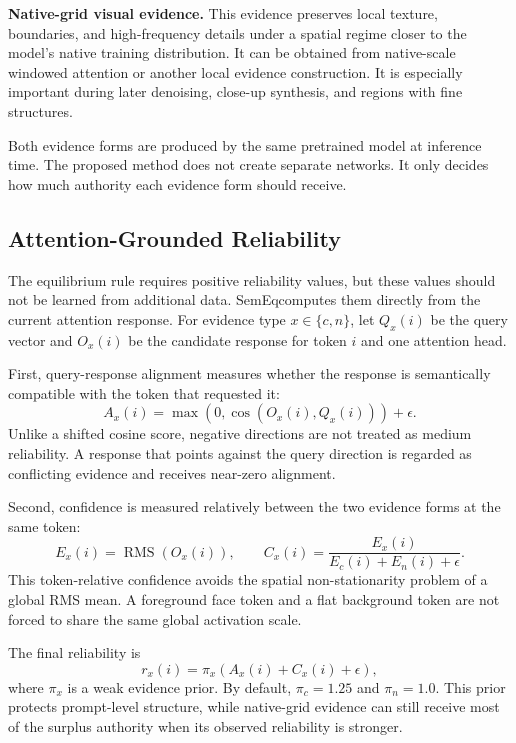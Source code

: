 \documentclass[10pt,twocolumn]{article}
\newcommand{\method}{SemEq}
\begin{document}
\noindent\textbf{Native-grid visual evidence.}
This evidence preserves local texture, boundaries, and high-frequency details under a spatial regime closer to the model's native training distribution. It can be obtained from native-scale windowed attention or another local evidence construction. It is especially important during later denoising, close-up synthesis, and regions with fine structures.

Both evidence forms are produced by the same pretrained model at inference time. The proposed method does not create separate networks. It only decides how much authority each evidence form should receive.

\subsection{Attention-Grounded Reliability}

The equilibrium rule requires positive reliability values, but these values should not be learned from additional data. \method computes them directly from the current attention response. For evidence type $x\in\{c,n\}$, let $Q_x(i)$ be the query vector and $O_x(i)$ be the candidate response for token $i$ and one attention head.

First, query-response alignment measures whether the response is semantically compatible with the token that requested it:
\begin{equation}
    A_x(i)=\max\left(0,\cos(O_x(i),Q_x(i))\right)+\epsilon .
    \label{eq:alignment}
\end{equation}
Unlike a shifted cosine score, negative directions are not treated as medium reliability. A response that points against the query direction is regarded as conflicting evidence and receives near-zero alignment.

Second, confidence is measured relatively between the two evidence forms at the same token:
\begin{equation}
    E_x(i)=\operatorname{RMS}(O_x(i)),\qquad
    C_x(i)=
    \frac{E_x(i)}
    {E_c(i)+E_n(i)+\epsilon}.
    \label{eq:confidence}
\end{equation}
This token-relative confidence avoids the spatial non-stationarity problem of a global RMS mean. A foreground face token and a flat background token are not forced to share the same global activation scale.

The final reliability is
\begin{equation}
    r_x(i)=\pi_x\left(A_x(i)+C_x(i)+\epsilon\right),
    \label{eq:reliability}
\end{equation}
where $\pi_x$ is a weak evidence prior. By default, $\pi_c=1.25$ and $\pi_n=1.0$. This prior protects prompt-level structure, while native-grid evidence can still receive most of the surplus authority when its observed reliability is stronger.
\end{document}
